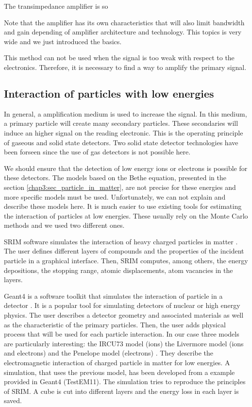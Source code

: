 \begin{refsection}
  


  The transimpedance amplifier is so 

  Note that the amplifier has its own characteristics that will also limit bandwidth and gain depending of amplifier architecture and technology. This topics is very wide and we just introduced the basics.

  This method can not be used when the signal is too weak with respect to the electronics. Therefore, it is necessary to find a way to amplify the primary signal.

  \subsection{Interaction of particles with low energies}
  In general, a amplification medium is used to increase the signal. In this medium, a primary particle will create many secondary particles. These secondaries will induce an higher signal on the reading electronic. This is the operating principle of gaseous and solid state detectors. Two solid state detector technologies have been forseen since the use of gas detectors is not possible here.

  We should ensure that the detection of low energy ions or electrons is possible for these detectors. The models based on the Bethe equation, presented in the section \ref{chap3:sec_particle_in_matter}, are not precise for these energies and more specific models must be used. Unfortunately, we can not explain and describe these models here. It is much easier to use existing tools for estimating the interaction of particles at low energies. These usually rely on the Monte Carlo methods and we used two different ones.

  SRIM software simulates the interaction of heavy charged particles in matter \cite{srim2013}. The user defines different layers of compounds and the properties of the incident particle in a graphical interface. Then, SRIM computes, among others, the energy depositions, the stopping range, atomic displacements, atom vacancies in the layers. 
  
  Geant4 is a software toolkit that simulates the interaction of particle in a detector \cite{Allison2006, Allison2016}. It is a popular tool for simulating detectors of nuclear or high energy physics. The user describes a detector geometry and associated materials as well as the characteristic of the primary particles. Then, the user adds physical process that will be used for each particle interaction. In our case three models are particularly interesting: the IRCU73 model (ions) the Livermore model (ions and electrons) and the Penelope model (electrons) \cite{Bimbot73,livermore97, salvat2009}. They describe the electromagnetic interaction of charged particle in matter for low energies. A simulation, that uses the previous model, has been developed from a example provided in Geant4 (TestEM11). The simulation tries to reproduce the principles of SRIM. A cube is cut into different layers and the energy loss in each layer is saved.


\end{refsection}
